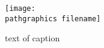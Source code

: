 \begin{figure}[t]
	\texttt{[image: \\pathgraphics filename]}
	\caption{text of caption}
\end{figure}

\endinput  %

